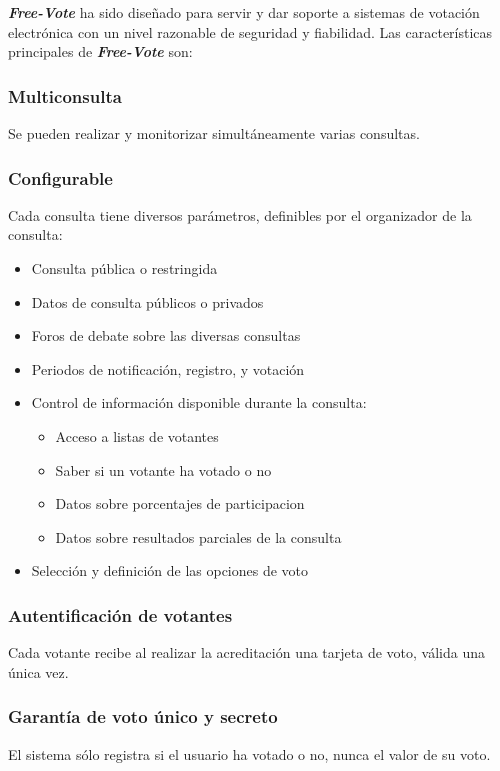 \textbf{\textit{Free-Vote}} ha sido diseñado para servir y dar soporte a sistemas de votación electrónica con un nivel razonable de seguridad y fiabilidad. Las características principales de \textbf{\textit{Free-Vote}} son:

\subsubsection*{Multiconsulta}
Se pueden realizar y monitorizar simultáneamente varias consultas.

\subsubsection*{Configurable}
Cada consulta tiene diversos parámetros, definibles por el organizador de la consulta:

\begin{itemize}
\item Consulta pública o restringida
\item Datos de consulta públicos o privados
\item Foros de debate sobre las diversas consultas
\item Periodos de notificación, registro, y votación
\item Control de información disponible durante la consulta:
	\begin{itemize}
	\item Acceso a listas de votantes
	\item Saber si un votante ha votado o no
	\item Datos sobre porcentajes de participacion
	\item Datos sobre resultados parciales de la consulta
	\end{itemize}
\item Selección y definición de las opciones de voto

\end{itemize}

\subsubsection*{Autentificación de votantes}
Cada votante recibe al realizar la acreditación una tarjeta de voto, válida una única vez.

\subsubsection*{Garantía de voto único y secreto}
El sistema sólo registra si el usuario ha votado o no, nunca el valor de su voto.

